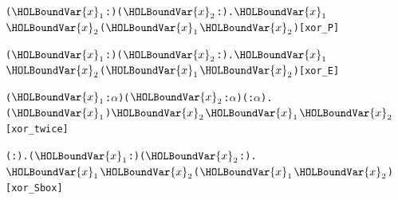 \documentclass{article}
\begin{document}
\begin{alltt}
  \HOLTokenTurnstile{} \HOLSymConst{\HOLTokenForall{}}(\ensuremath{\HOLBoundVar{x}\sb{\mathrm{1}}} :) (\ensuremath{\HOLBoundVar{x}\sb{\mathrm{2}}} :).  \ensuremath{\HOLBoundVar{x}\sb{\mathrm{1}}} \HOLSymConst{\HOLTokenEor{}}  \ensuremath{\HOLBoundVar{x}\sb{\mathrm{2}}} \HOLSymConst{=}  (\ensuremath{\HOLBoundVar{x}\sb{\mathrm{1}}} \HOLSymConst{\HOLTokenEor{}} \ensuremath{\HOLBoundVar{x}\sb{\mathrm{2}}})\hfill{[xor_P]}
\end{alltt}

\begin{alltt}
  \HOLTokenTurnstile{} \HOLSymConst{\HOLTokenForall{}}(\ensuremath{\HOLBoundVar{x}\sb{\mathrm{1}}} :) (\ensuremath{\HOLBoundVar{x}\sb{\mathrm{2}}} :).  \ensuremath{\HOLBoundVar{x}\sb{\mathrm{1}}} \HOLSymConst{\HOLTokenEor{}}  \ensuremath{\HOLBoundVar{x}\sb{\mathrm{2}}} \HOLSymConst{=}  (\ensuremath{\HOLBoundVar{x}\sb{\mathrm{1}}} \HOLSymConst{\HOLTokenEor{}} \ensuremath{\HOLBoundVar{x}\sb{\mathrm{2}}})\hfill{[xor_E]}
\end{alltt}

\begin{alltt}
  \HOLTokenTurnstile{} \HOLSymConst{\HOLTokenForall{}}(\ensuremath{\HOLBoundVar{x}\sb{\mathrm{1}}} :\ensuremath{\alpha} ) (\ensuremath{\HOLBoundVar{x}\sb{\mathrm{2}}} :\ensuremath{\alpha} ) ( :\ensuremath{\alpha} ).
     (\ensuremath{\HOLBoundVar{x}\sb{\mathrm{1}}} \HOLSymConst{\HOLTokenEor{}} ) \HOLSymConst{\HOLTokenEor{}} \ensuremath{\HOLBoundVar{x}\sb{\mathrm{2}}} \HOLSymConst{\HOLTokenEor{}}  \HOLSymConst{=} \ensuremath{\HOLBoundVar{x}\sb{\mathrm{1}}} \HOLSymConst{\HOLTokenEor{}} \ensuremath{\HOLBoundVar{x}\sb{\mathrm{2}}}\hfill{[xor_twice]}
\end{alltt}

\begin{alltt}
  \HOLTokenTurnstile{} \HOLSymConst{\HOLTokenForall{}}( :). \HOLSymConst{\HOLTokenExists{}}(\ensuremath{\HOLBoundVar{x}\sb{\mathrm{1}}} :) (\ensuremath{\HOLBoundVar{x}\sb{\mathrm{2}}} :).
        \HOLSymConst{\HOLTokenImp{}}  \ensuremath{\HOLBoundVar{x}\sb{\mathrm{1}}} \HOLSymConst{\HOLTokenEor{}}  \ensuremath{\HOLBoundVar{x}\sb{\mathrm{2}}} \HOLSymConst{\HOLTokenNotEqual{}}  (\ensuremath{\HOLBoundVar{x}\sb{\mathrm{1}}} \HOLSymConst{\HOLTokenEor{}} \ensuremath{\HOLBoundVar{x}\sb{\mathrm{2}}})\hfill{[xor_Sbox]}
\end{alltt}
\end{document}
